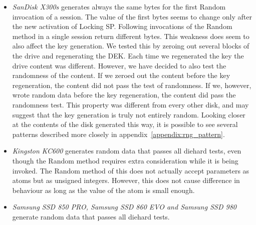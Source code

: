 \begin{itemize}
    \item \emph{SanDisk X300s} generates always the same bytes for the first Random invocation of a session. The value of the first bytes seems to change only after the new activation of Locking SP. Following invocations of the Random method in a single session return different bytes. This weakness does seem to also affect the key generation. We tested this by zeroing out several blocks of the drive and regenerating the DEK. Each time we regenerated the key the drive content was different. However, we have decided to also test the randomness of the content. If we zeroed out the content before the key regeneration, the content did not pass the test of randomness. If we, however, wrote random data before the key regeneration, the content did pass the randomness test. This property was different from every other disk, and may suggest that the key generation is truly not entirely random. Looking closer at the contents of the disk generated this way, it is possible to see several patterns described more closely in appendix~\ref{appendix:rng_pattern}.%
    \item \emph{Kingston KC600} generates random data that passes all diehard tests, even though the Random method requires extra consideration while it is being invoked. The Random method of this does not actually accept parameters as atoms but as unsigned integers. However, this does not cause difference in behaviour as long as the value of the atom is small enough.  %
    \item \emph{Samsung SSD 850 PRO, Samsung SSD 860 EVO and Samsung SSD 980} generate random data that passes all diehard tests. %
\end{itemize}

